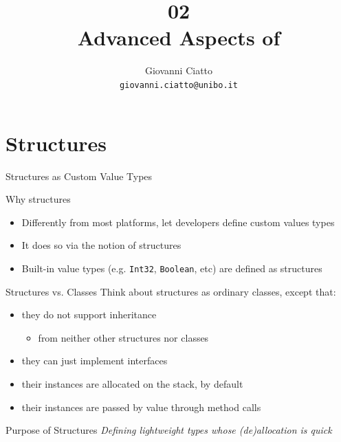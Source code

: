 \documentclass[presentation]{beamer}
\title[\lecturecode{02}]{02 \\ Advanced Aspects of \dotnet}
\author[Giovanni Ciatto]{Giovanni Ciatto\\\texttt{giovanni.ciatto@unibo.it}}
\begin{document}
\frame[label=coverpage]{\titlepage}

\section{Structures}

\begin{frame}[allowframebreaks]{Structures as Custom Value Types}
  \begin{block}{Why structures}
    \begin{itemize}
      \item Differently from most platforms, \dotnet let developers define \alert{custom} values types
      \item It does so via the notion of \alert{structures}
      \item Built-in value types (e.g. \texttt{Int32}, \texttt{Boolean}, etc) are defined as structures
    \end{itemize}
  \end{block}

  \begin{block}{Structures vs. Classes}
    Think about structures as ordinary classes, except that:
    \begin{itemize}
      \item they \alert{do not} support \alert{inheritance}
      \begin{itemize}
        \item from neither other structures nor classes
      \end{itemize}

      \item they \alert{can} just implement \alert{interfaces}
      \item their instances are allocated \alert{on the stack}, by default
      \item their instances are passed \alert{by value} through method calls
    \end{itemize}
  \end{block}

  \begin{alertblock}{Purpose of Structures}\centering\itshape
    Defining \alert{lightweight} types whose (de)allocation is \alert{quick}
  \end{alertblock}


\end{frame}
\end{document}
